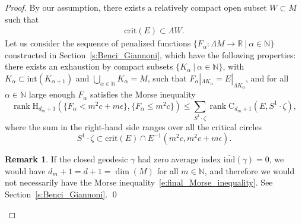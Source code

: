 \documentclass[reqno]{amsart}
\numberwithin{equation}{section}
\theoremstyle{personal}%
\theoremstyle{definition}
\newtheorem{rem}{Remark}[section]
\newcommand{\N}{\mathds{N}}
\newcommand{\R}{\mathds{R}}
\newcommand{\crit}{\mathrm{crit}}
\newcommand{\Hom}{\mathrm{H}}
\newcommand{\Loc}{\mathrm{C}}
\newcommand{\avind}{\overline{\ind}}
\newcommand{\ind}{\mathrm{ind}}
\DeclareMathOperator{\rank}{\mathrm{rank}}
\begin{document}
\begin{proof}
By our assumption, there exists a relatively compact open subset $W\subset M$ such that
\begin{align*}
 \crit(E)\subset\Lambda W.
\end{align*}
Let us consider the sequence of penalized functions  $\{F_\alpha:\Lambda M\to\R\ |\ \alpha\in\N\}$ constructed in Section~\ref{s:Benci_Giannoni}, which have the following properties: there exists an exhaustion by compact subsets $\{K_\alpha\ |\ \alpha\in\N\}$, with  $K_\alpha\subset\mathrm{int}(K_{\alpha+1})$ and $\bigcup_{\alpha\in\N}K_\alpha=M$, such that $F_\alpha|_{\Lambda K_\alpha}=E|_{\Lambda K_\alpha}$, and for all $\alpha\in\N$ large enough $F_\alpha$ satisfies the Morse inequality
\begin{equation}
\label{e:final_Morse_inequality}
\rank \Hom_{d_m+1}(\{F_\alpha<m^2c+m\epsilon\},\{F_\alpha\leq m^2c\})
\leq 
\sum_{S^1\cdot\zeta} \rank\Loc_{d_m+1}(E,S^1\cdot\zeta),
\end{equation}
where the sum in the right-hand side ranges over all the critical circles 
\[S^1\cdot\zeta\subset\crit(E)\cap E^{-1}(m^2c,m^2c+m\epsilon).\]

\begin{rem}
\label{r:avind_zero}
If the closed geodesic $\gamma$ had zero average index $\avind(\gamma)=0$, we would have $d_m+1=d+1=\dim(M)$ for all $m\in\N$, and therefore we would not necessarily  have the Morse inequality~\eqref{e:final_Morse_inequality}. See Section~\ref{s:Benci_Giannoni}.
\hfill\qed
\end{rem}


\end{proof}
\end{document}
